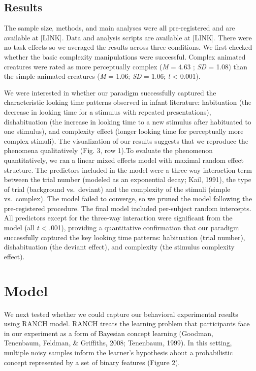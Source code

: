 \documentclass[10pt, letterpaper]{article}
\begin{document}
\hypertarget{results}{%
\subsection{Results}\label{results}}

The sample size, methods, and main analyses were all pre-registered and
are available at {[}LINK{]}. Data and analysis scripts are available at
{[}LINK{]}. There were no task effects so we averaged the results across
three conditions. We first checked whether the basic complexity
manipulations were successful. Complex animated creatures were rated as
more perceptually complex (\emph{M} = 4.63 ; \emph{SD} = 1.08) than the
simple animated creatures (\emph{M} = 1.06; \emph{SD} = 1.06; \emph{t}
\textless{} 0.001).

We were interested in whether our paradigm successfully captured the
characteristic looking time patterns observed in infant literature:
habituation (the decrease in looking time for a stimulus with repeated
presentations), dishabituation (the increase in looking time to a new
stimulus after habituated to one stimulus), and complexity effect
(longer looking time for perceptually more complex stimuli). The
visualization of our results suggests that we reproduce the phenomena
qualitatively (Fig. 3, row 1).To evaluate the phenomenon quantitatively,
we ran a linear mixed effects model with maximal random effect
structure. The predictors included in the model were a three-way
interaction term between the trial number (modeled as an exponential
decay; Kail, 1991), the type of trial (background vs.~deviant) and the
complexity of the stimuli (simple vs.~complex). The model failed to
converge, so we pruned the model following the pre-registered procedure.
The final model included per-subject random intercepts. All predictors
except for the three-way interaction were significant from the model
(all \emph{t} \textless{} .001), providing a quantitative confirmation
that our paradigm successfully captured the key looking time patterns:
habituation (trial number), dishabituation (the deviant effect), and
complexity (the stimulus complexity effect).

\hypertarget{model}{%
\section{Model}\label{model}}

We next tested whether we could capture our behavioral experimental
results using RANCH model. RANCH treats the learning problem that
participants face in our experiment as a form of Bayesian concept
learning (Goodman, Tenenbaum, Feldman, \& Griffiths, 2008; Tenenbaum,
1999). In this setting, multiple noisy samples inform the learner's
hypothesis about a probabilistic concept represented by a set of binary
features (Figure 2).
\end{document}
